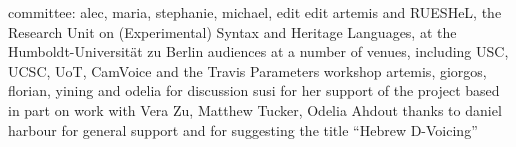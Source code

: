\addchap{\lsAcknowledgementTitle} 

committee: alec, maria, stephanie, michael, edit
edit
artemis and RUESHeL, the Research Unit on (Experimental) Syntax and Heritage Languages, at the Humboldt-Universit\"at zu Berlin
audiences at a number of venues, including USC, UCSC, UoT, CamVoice and the Travis Parameters workshop
artemis, giorgos, florian, yining and odelia for discussion
susi for her support of the project
based in part on work with Vera Zu, Matthew Tucker, Odelia Ahdout
thanks to daniel harbour for general support and for suggesting the title ``Hebrew D-Voicing''
